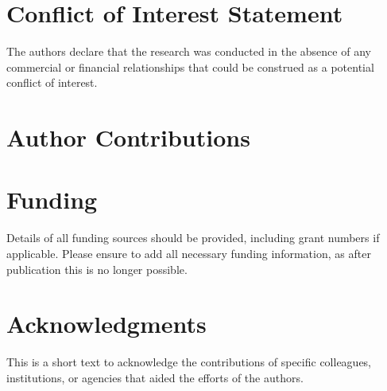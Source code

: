 \documentclass[utf8, a4paper, final, crop]{frontiersSCNS} %
\begin{document}
\section*{Conflict of Interest Statement}

The authors declare that the research was conducted in the absence of any commercial or financial relationships that could be construed as a potential conflict of interest.

\section*{Author Contributions}
%

\section*{Funding}

Details of all funding sources should be provided, including grant numbers if applicable. Please ensure to add all necessary funding information, as after publication this is no longer possible.

\section*{Acknowledgments}

This is a short text to acknowledge the contributions of specific colleagues, institutions, or agencies that aided the efforts of the authors.

\end{document}

